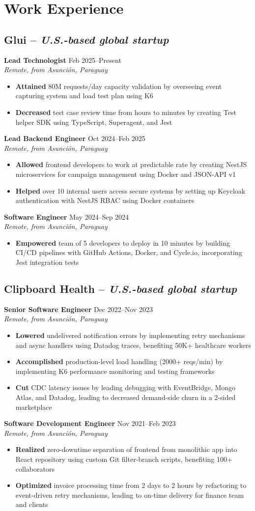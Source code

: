 \documentclass[11pt,a4paper]{article}
\newcommand{\actionverb}[1]{\textcolor{actioncolor}{\textbf{#1}}}
\newcommand{\cvcompany}[3]{
  \subsection{#1 \textcolor{mediumgray}{#2}}
  #3
  \vspace{0.5em}
}
\newcommand{\cvrole}[4]{
  \textbf{#1} \hfill \textcolor{mediumgray}{\small #2}\\
  \textit{#3}
  \begin{itemize}
    #4
  \end{itemize}
  \vspace{1em}
}
\begin{document}
\section{Work Experience}

\cvcompany{Glui}{-- \textit{U.S.-based global startup}}{
  \cvrole{Lead Technologist}{Feb 2025--Present}{Remote, from Asunción, Paraguay}{
    \item \actionverb{Attained} 80M requests/day capacity validation by overseeing event capturing system and load test plan using K6
    \item \actionverb{Decreased} test case review time from hours to minutes by creating Test helper SDK using TypeScript, Superagent, and Jest
  }
  
  \cvrole{Lead Backend Engineer}{Oct 2024--Feb 2025}{Remote, from Asunción, Paraguay}{
    \item \actionverb{Allowed} frontend developers to work at predictable rate by creating NestJS microservices for campaign management using Docker and JSON-API v1
    \item \actionverb{Helped} over 10 internal users access secure systems by setting up Keycloak authentication with NestJS RBAC using Docker containers
  }
  
  \cvrole{Software Engineer}{May 2024--Sep 2024}{Remote, from Asunción, Paraguay}{
    \item \actionverb{Empowered} team of 5 developers to deploy in 10 minutes by building CI/CD pipelines with GitHub Actions, Docker, and Cycle.io, incorporating Jest integration tests
  }
}

\cvcompany{Clipboard Health}{-- \textit{U.S.-based global startup}}{
  \cvrole{Senior Software Engineer}{Dec 2022--Nov 2023}{Remote, from Asunción, Paraguay}{
    \item \actionverb{Lowered} undelivered notification errors by implementing retry mechanisms and async handlers using Datadog traces, benefiting 50K+ healthcare workers
    \item \actionverb{Accomplished} production-level load handling (2000+ reqs/min) by implementing K6 performance monitoring and testing frameworks
    \item \actionverb{Cut} CDC latency issues by leading debugging with EventBridge, Mongo Atlas, and Datadog, leading to decreased demand-side churn in a 2-sided marketplace
  }
  
  \cvrole{Software Development Engineer}{Nov 2021--Feb 2023}{Remote, from Asunción, Paraguay}{
    \item \actionverb{Realized} zero-downtime separation of frontend from monolithic app into React repository using custom Git filter-branch scripts, benefiting 100+ collaborators
    \item \actionverb{Optimized} invoice processing time from 2 days to 2 hours by refactoring to event-driven retry mechanisms, leading to on-time delivery for finance team and clients
  }
}
\end{document}
